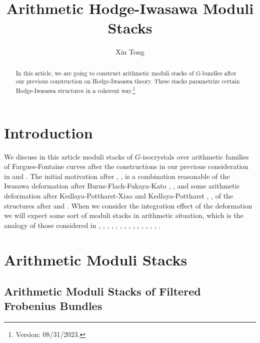\documentclass[12pt]{article}
\title{Arithmetic Hodge-Iwasawa Moduli Stacks}
\author{Xin Tong}
\date{}
\begin{document}
\maketitle

\begin{abstract}
\noindent In this article, we are going to construct arithmetic moduli stacks of $G$-bundles after our previous construction on Hodge-Iwasawa theory. These stacks parametrize certain Hodge-Iwasawa structures in a coherent way.\footnote{Version: 08/31/2023.}
\end{abstract}




\tableofcontents





\newpage
\section{Introduction}

We discuss in this article moduli stacks of $G$-isocrystals over arithmetic families of Fargues-Fontaine curves after the constructions in our previous consideration in \cite{T1} and \cite{T2}. The initial motivation after \cite{Iwa}, \cite{T}, \cite{F} is a combination reasonable of the Iwasawa deformation after Burns-Flach-Fukaya-Kato \cite{BF1}, \cite{BF2}, \cite{FK} and some arithmetic deformation after Kedlaya-Pottharst-Xiao and Kedlaya-Pottharst \cite{KPX}, \cite{KP}, of the structures after \cite{KL1} and \cite{KL2}. When we consider the integration effect of the deformation we will expect some sort of moduli stacks in arithmetic situation, which is the analogy of those considered in \cite{He1}, \cite{PR}, \cite{Dr}, \cite{SW}, \cite{Ked}, \cite{RZ}, \cite{G}, \cite{Dr1}, \cite{Dr2}, \cite{Har}, \cite{Har1},  \cite{HV}, \cite{M}, \cite{FS}, \cite{Sch1}.








\section{Arithmetic Moduli Stacks}


 

\subsection{Arithmetic Moduli Stacks of Filtered Frobenius Bundles}
\end{document}
